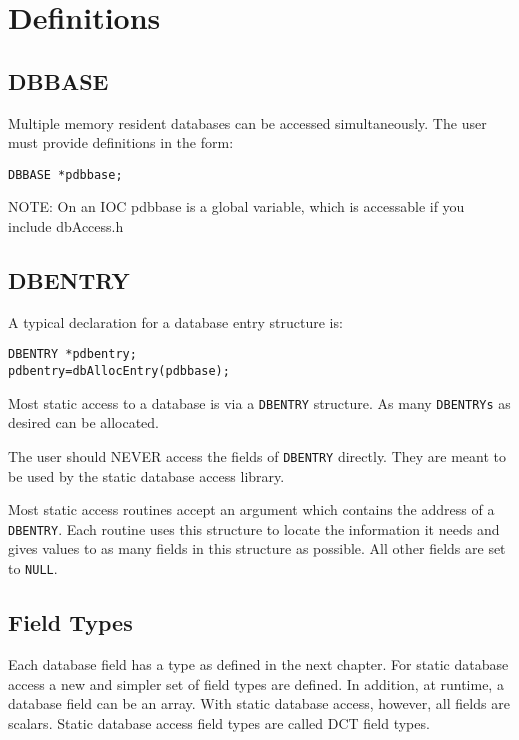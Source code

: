 \section{Definitions}

\subsection{DBBASE}

Multiple memory resident databases can be accessed simultaneously. The user must provide definitions in the form:

\begin{verbatim}DBBASE *pdbbase;
\end{verbatim}NOTE: On an IOC pdbbase is a global variable, which is accessable if you include dbAccess.h

\subsection{DBENTRY}

A typical declaration for a database entry structure is:

\begin{verbatim}DBENTRY *pdbentry;
pdbentry=dbAllocEntry(pdbbase);
\end{verbatim}Most static access to a database is via a \verb|DBENTRY| structure. As many \verb|DBENTRYs| as desired can be allocated.

The user should NEVER access the fields of \verb|DBENTRY| directly. They are meant to be used by the static database access 
library.

Most static access routines accept an argument which contains the address of a \verb|DBENTRY|. Each routine uses this structure 
to locate the information it needs and gives values to as many fields in this structure as possible. All other fields are set to 
\verb|NULL|.

\subsection{Field Types}

Each database field has a type as defined in the next chapter. For static database access a new and simpler set of field 
types are defined. In addition, at runtime, a database field can be an array. With static database access, however, all fields 
are scalars. Static database access field types are called DCT field types.

